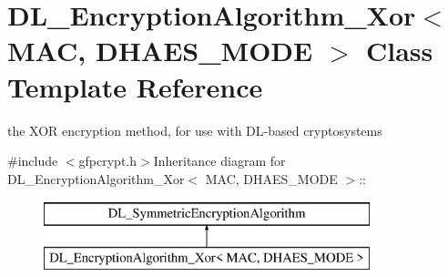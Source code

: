 \hypertarget{class_d_l___encryption_algorithm___xor}{
\section{DL\_\-EncryptionAlgorithm\_\-Xor$<$ MAC, DHAES\_\-MODE $>$ Class Template Reference}
\label{class_d_l___encryption_algorithm___xor}
}


the XOR encryption method, for use with DL-\/based cryptosystems  


{\ttfamily \#include $<$gfpcrypt.h$>$}Inheritance diagram for DL\_\-EncryptionAlgorithm\_\-Xor$<$ MAC, DHAES\_\-MODE $>$::\begin{figure}[H]
\begin{center}
\leavevmode
\includegraphics[height=2cm]{class_d_l___encryption_algorithm___xor}
\end{center}
\end{figure}
